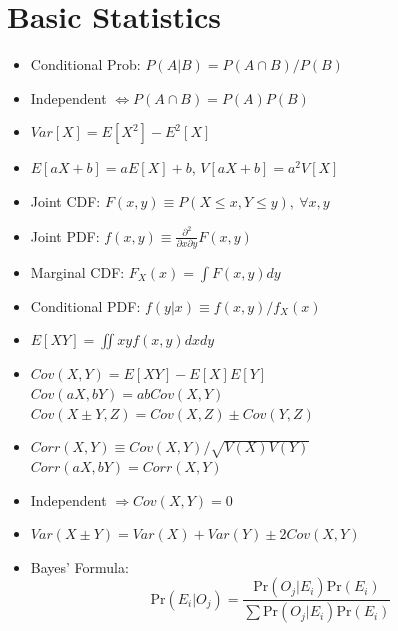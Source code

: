 \documentclass[10pt, twocolumn]{article}
\begin{document}
\pagestyle{myheadings}

\section*{Basic Statistics} \vspace*{-1em}
\begin{itemize}
\item Conditional Prob: $P(A|B)=P(A\cap B)/P(B)$
\item Independent $\Longleftrightarrow P(A\cap B)=P(A)P(B)$
\item $Var[X]=E[X^2]-E^2[X]$
\item $E[aX+b]=aE[X]+b$, $V[aX+b]=a^2V[X]$
\item Joint CDF: $F(x,y)\equiv P(X\leq x, Y\leq y),\ \forall x,y$
\item Joint PDF: $f(x,y)\equiv \frac{\partial^2}{\partial x\partial y}F(x,y)$
\item Marginal CDF: $F_X(x)=\int F(x,y)dy$
\item Conditional PDF: $f(y|x)\equiv f(x,y)/f_X(x)$
\item $E[XY]=\iint xyf(x,y)dxdy$
\item $Cov(X,Y)=E[XY]-E[X]E[Y]$ \\
$Cov(aX,bY)=abCov(X,Y)$ \\
$Cov(X\pm Y,Z)=Cov(X,Z)\pm Cov(Y,Z)$
\item $Corr(X,Y)\equiv Cov(X,Y)/\sqrt{V(X)V(Y)}$ \\ 
$Corr(aX,bY)=Corr(X,Y)$
\item Independent $\Rightarrow Cov(X,Y)=0$
\item $Var(X\pm Y)=Var(X)+Var(Y)\pm 2Cov(X,Y)$
\item Bayes' Formula: 
\[ \text{Pr}(E_i|O_j)= \frac{\text{Pr}(O_j|E_i)\text{Pr}(E_i)}{\sum\text{Pr}(O_j|E_i)\text{Pr}(E_i)} \]
\end{itemize}
\end{document}
